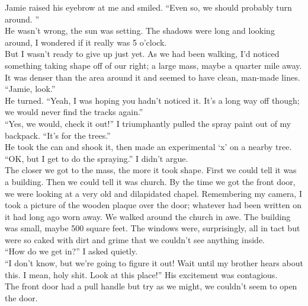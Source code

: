 \documentclass[a5paper]{scrartcl}
\begin{document}
Jamie raised his eyebrow at me and smiled. \enquote{Even so, we should probably turn around. }\\


He wasn't wrong, the sun was setting. The shadows were long and looking around, I wondered if it really was 5 o'clock. \\


But I wasn't ready to give up just yet. As we had been walking, I'd noticed something taking shape off of our right; a large mass, maybe a quarter mile away. It was denser than the area around it and seemed to have clean, man-made lines. \\


\enquote{Jamie, look.} \\


He turned. \enquote{Yeah, I was hoping you hadn't noticed it. It's a long way off though; we would never find the tracks again.}\\


\enquote{Yes, we would, check it out!} I triumphantly pulled the spray paint out of my backpack. \enquote{It's for the trees.}\\


He took the can and shook it, then made an experimental ‘x' on a nearby tree. \\


\enquote{OK, but I get to do the spraying.} I didn't argue.\\


The closer we got to the mass, the more it took shape. First we could tell it was a building. Then we could tell it was church.  By the time we got the front door, we were looking at a very old and dilapidated chapel. Remembering my camera, I took a picture of the wooden plaque over the door; whatever had been written on it had long ago worn away. We walked around the church in awe. The building was small, maybe 500 square feet. The windows were, surprisingly, all in tact but were so caked with dirt and grime that we couldn't see anything inside. \\


\enquote{How do we get in?} I asked quietly.\\


\enquote{I don't know, but we're going to figure it out! Wait until my brother hears about this. I mean, holy shit. Look at this place!} His excitement was contagious.\\


The front door had a pull handle but try as we might, we couldn't seem to open the door. \\
\end{document}
